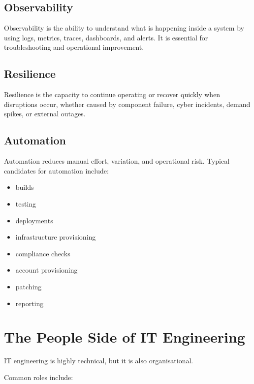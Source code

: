 \documentclass[
  british,
  letterpaper,
  DIV=11,
  numbers=noendperiod]{scrartcl}
\providecommand{\tightlist}{%
  \setlength{\itemsep}{0pt}\setlength{\parskip}{0pt}}
\begin{document}
\subsection{Observability}\label{observability}

Observability is the ability to understand what is happening inside a
system by using logs, metrics, traces, dashboards, and alerts. It is
essential for troubleshooting and operational improvement.

\subsection{Resilience}\label{resilience}

Resilience is the capacity to continue operating or recover quickly when
disruptions occur, whether caused by component failure, cyber incidents,
demand spikes, or external outages.

\subsection{Automation}\label{automation}

Automation reduces manual effort, variation, and operational risk.
Typical candidates for automation include:

\begin{itemize}
\tightlist
\item
  builds
\item
  testing
\item
  deployments
\item
  infrastructure provisioning
\item
  compliance checks
\item
  account provisioning
\item
  patching
\item
  reporting
\end{itemize}

\section{The People Side of IT
Engineering}\label{the-people-side-of-it-engineering}

IT engineering is highly technical, but it is also organisational.

Common roles include:
\end{document}
